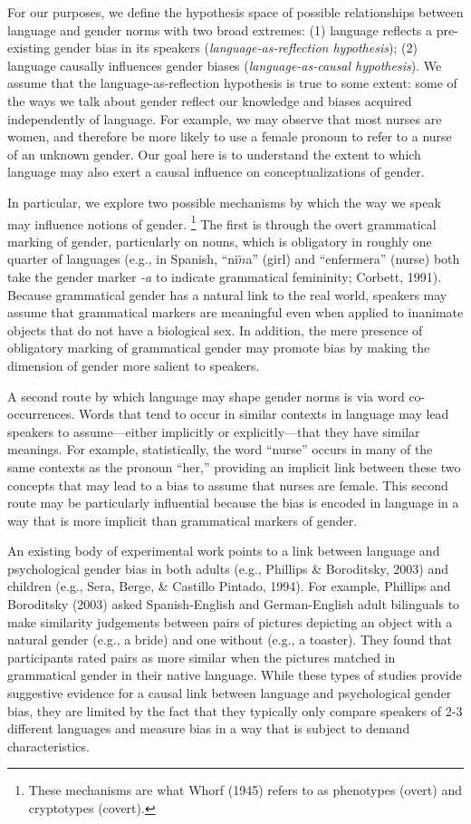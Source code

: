 \documentclass[10pt, letterpaper]{article}
\begin{document}
For our purposes, we define the hypothesis space of possible
relationships between language and gender norms with two broad extremes:
(1) language reflects a pre-existing gender bias in its speakers
(\emph{language-as-reflection hypothesis}); (2) language causally
influences gender biases (\emph{language-as-causal hypothesis}). We
assume that the language-as-reflection hypothesis is true to some
extent: some of the ways we talk about gender reflect our knowledge and
biases acquired independently of language. For example, we may observe
that most nurses are women, and therefore be more likely to use a female
pronoun to refer to a nurse of an unknown gender. Our goal here is to
understand the extent to which language may also exert a causal
influence on conceptualizations of gender.

In particular, we explore two possible mechanisms by which the way we
speak may influence notions of gender.
\footnote{These mechanisms are what Whorf (1945) refers to as phenotypes (overt) and cryptotypes (covert).}
The first is through the overt grammatical marking of gender,
particularly on nouns, which is obligatory in roughly one quarter of
languages (e.g., in Spanish, ``ni\(\tilde n\)a'' (girl) and
``enfermera'' (nurse) both take the gender marker \emph{-a} to indicate
grammatical femininity; Corbett, 1991). Because grammatical gender has a
natural link to the real world, speakers may assume that grammatical
markers are meaningful even when applied to inanimate objects that do
not have a biological sex. In addition, the mere presence of obligatory
marking of grammatical gender may promote bias by making the dimension
of gender more salient to speakers.

A second route by which language may shape gender norms is via word
co-occurrences. Words that tend to occur in similar contexts in language
may lead speakers to assume---either implicitly or explicitly---that
they have similar meanings. For example, statistically, the word
``nurse'' occurs in many of the same contexts as the pronoun ``her,''
providing an implicit link between these two concepts that may lead to a
bias to assume that nurses are female. This second route may be
particularly influential because the bias is encoded in language in a
way that is more implicit than grammatical markers of gender.

An existing body of experimental work points to a link between language
and psychological gender bias in both adults (e.g., Phillips \&
Boroditsky, 2003) and children (e.g., Sera, Berge, \& Castillo Pintado,
1994). For example, Phillips and Boroditsky (2003) asked Spanish-English
and German-English adult bilinguals to make similarity judgements
between pairs of pictures depicting an object with a natural gender
(e.g., a bride) and one without (e.g., a toaster). They found that
participants rated pairs as more similar when the pictures matched in
grammatical gender in their native language. While these types of
studies provide suggestive evidence for a causal link between language
and psychological gender bias, they are limited by the fact that they
typically only compare speakers of 2-3 different languages and measure
bias in a way that is subject to demand characteristics.
\end{document}
